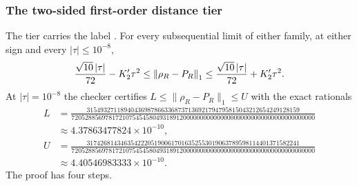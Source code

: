\subsubsection{The two-sided first-order distance tier}
\label{sec:ay2-tier}
The tier carries the label . For
every subsequential limit of either family, at either sign and every
$|\tau|\le10^{-8}$,
\begin{equation}
 \frac{\sqrt{10}\,|\tau|}{72}-K_2'\tau^2\le\left\lVert\rho_R-P_R\right\rVert_1
 \le\frac{\sqrt{10}\,|\tau|}{72}+K_2'\tau^2 .
 \label{eq:ay2-tier}
\end{equation}
At $|\tau|=10^{-8}$ the checker certifies $L\le\lVert \rho_R-P_R\rVert_1\le U$ with
the exact rationals
\begin{equation}
 \begin{aligned}
 L&=\frac{315493271189404369878663368737136921794795815043212654249128159}{720528856978172107545458049318912000000000000000000000000000000000000000}\\
 &\approx4.37863477824\times10^{-10},\\
 U&=\frac{317426814346354222051900617016352553019063789598114401371582241}{720528856978172107545458049318912000000000000000000000000000000000000000}\\
 &\approx4.40546983333\times10^{-10}.
 \end{aligned}
 \label{eq:ay2-LU}
\end{equation}
The proof has four steps.

